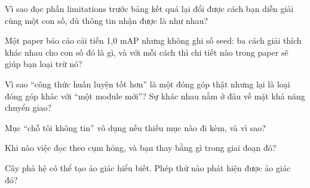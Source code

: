 \documentclass[../../deep_learning.tex]{subfiles}
\begin{document}
\begin{tukiem}
\item Vì sao đọc phần limitations trước bảng kết quả lại đổi được cách bạn diễn giải cùng một con số, dù thông tin nhận được là như nhau?
\item Một paper báo cáo cải tiến 1,0 mAP nhưng không ghi số seed: ba cách giải thích khác nhau cho con số đó là gì, và với mỗi cách thì chi tiết nào trong paper sẽ giúp bạn loại trừ nó?
\item Vì sao ``công thức huấn luyện tốt hơn'' là một đóng góp thật nhưng lại là loại đóng góp khác với ``một module mới''? Sự khác nhau nằm ở đâu về mặt khả năng chuyển giao?
\item Mục ``chỗ tôi không tin'' vô dụng nếu thiếu mục nào đi kèm, và vì sao?
\item Khi nào việc đọc theo cụm hỏng, và bạn thay bằng gì trong giai đoạn đó?
\item Cây phả hệ có thể tạo ảo giác hiểu biết. Phép thử nào phát hiện được ảo giác đó?
\end{tukiem}
\ifSubfilesClassLoaded{\printbibliography[title={Nguồn}]}{}
\end{document}
